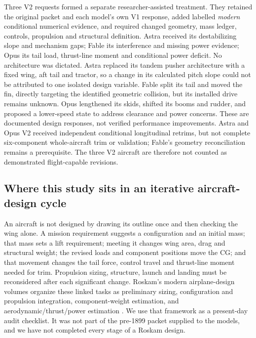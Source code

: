 \documentclass[10pt,letterpaper]{article}
\begin{document}
Three V2 requests formed a separate researcher-assisted treatment. They retained the original packet and each model's own V1 response, added labelled \emph{modern} conditional numerical evidence, and required changed geometry, mass ledger, controls, propulsion and structural definition. Astra received its destabilizing slope and mechanism gaps; Fable its interference and missing power evidence; Opus its tail load, thrust-line moment and conditional power deficit. No architecture was dictated. Astra replaced its tandem pusher architecture with a fixed wing, aft tail and tractor, so a change in its calculated pitch slope could not be attributed to one isolated design variable. Fable split its tail and moved the fin, directly targeting the identified geometric collision, but its installed drive remains unknown. Opus lengthened its skids, shifted its booms and rudder, and proposed a lower-speed state to address clearance and power concerns. These are documented design responses, not verified performance improvements. Astra and Opus V2 received independent conditional longitudinal retrims, but not complete six-component whole-aircraft trim or validation; Fable's geometry reconciliation remains a prerequisite. The three V2 aircraft are therefore not counted as demonstrated flight-capable revisions.

\subsection{Where this study sits in an iterative aircraft-design cycle}
An aircraft is not designed by drawing its outline once and then checking the wing alone. A mission requirement suggests a configuration and an initial mass; that mass sets a lift requirement; meeting it changes wing area, drag and structural weight; the revised loads and component positions move the CG; and that movement changes the tail force, control travel and thrust-line moment needed for trim. Propulsion sizing, structure, launch and landing must be reconsidered after each significant change. Roskam's modern airplane-design volumes organize these linked tasks as preliminary sizing, configuration and propulsion integration, component-weight estimation, and aerodynamic/thrust/power estimation \cite{ref36,ref37,ref38,ref39}. We use that framework as a present-day audit checklist. It was not part of the pre-1899 packet supplied to the models, and we have not completed every stage of a Roskam design.
\end{document}
